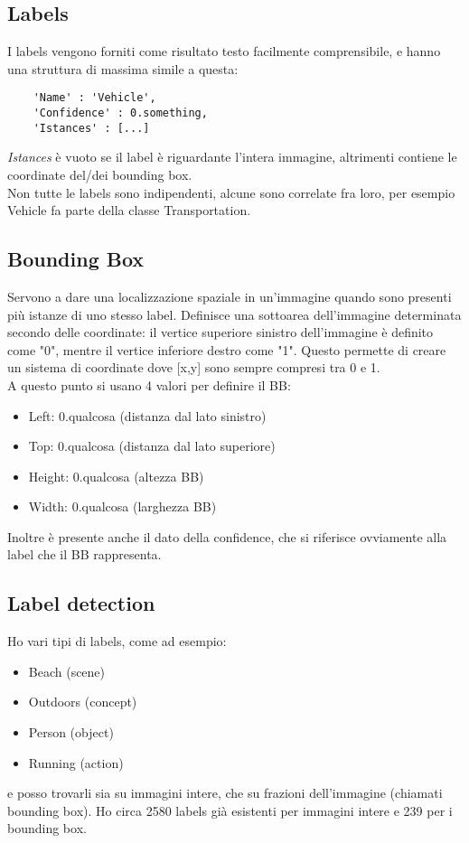 \documentclass{classes/base}
\begin{document}
    \subsection*{Labels}
    I labels vengono forniti come risultato testo facilmente comprensibile, e hanno una struttura di massima simile a questa:
    \begin{lstlisting}
    'Name' : 'Vehicle',
    'Confidence' : 0.something,
    'Istances' : [...]
    \end{lstlisting}

    \textit{Istances} è vuoto se il label è
                        riguardante l'intera immagine, altrimenti 
                        contiene le coordinate del/dei bounding box.\\
    Non tutte le labels sono indipendenti, alcune sono correlate fra loro, per esempio Vehicle fa parte della classe Transportation.

    \subsection*{Bounding Box}
    Servono a dare una localizzazione spaziale in un'immagine quando sono presenti più istanze di uno stesso label.
    Definisce una sottoarea dell'immagine determinata secondo delle coordinate: il vertice superiore sinistro dell'immagine è definito come "0", mentre il vertice inferiore destro come "1". 
    Questo permette di creare un sistema di coordinate dove [x,y] sono sempre compresi tra 0 e 1. \\
    A questo punto si usano 4 valori per definire il BB: 
    \begin{itemize}
        \item Left: 0.qualcosa (distanza dal lato sinistro)
        \item Top: 0.qualcosa (distanza dal lato superiore)  
        \item Height: 0.qualcosa (altezza BB)
        \item Width: 0.qualcosa (larghezza BB)
    \end{itemize}
    Inoltre è presente anche il dato della confidence, che si riferisce ovviamente alla label che il BB rappresenta.

    \subsection*{Label detection}
    Ho vari tipi di labels, come ad esempio: 
    \begin{itemize}
        \item Beach (scene)
        \item Outdoors (concept)
        \item Person (object)
        \item Running (action)
    \end{itemize}
    e posso trovarli sia su immagini intere, che su frazioni dell'immagine (chiamati bounding box). 
    Ho circa 2580 labels già esistenti per immagini intere e 239 per i bounding box.
\end{document}

